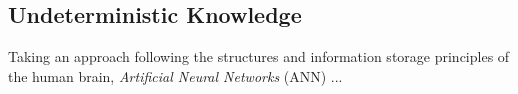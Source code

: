%
%
%
%
%
%
%

\subsection{Undeterministic Knowledge}
\label{undeterministic_knowledge_heading}

Taking an approach following the structures and information storage principles
of the human brain, \emph{Artificial Neural Networks} (ANN) ...




